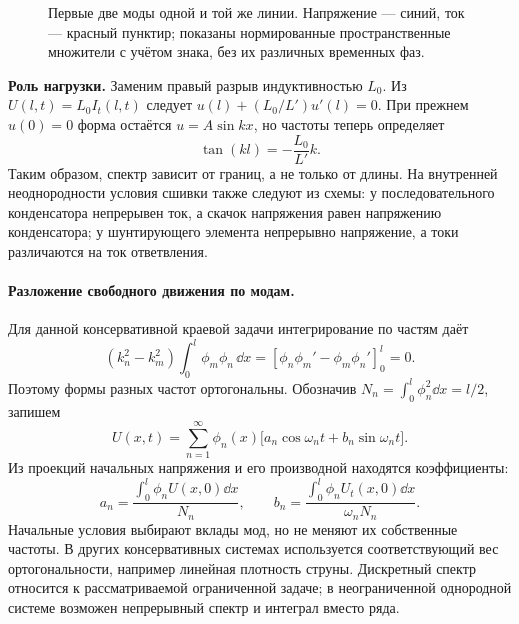 \begin{figure}[H]\centering

\caption{Первые две моды одной и той же линии. Напряжение --- синий, ток --- красный пунктир; показаны нормированные пространственные множители с учётом знака, без их различных временных фаз.}
\end{figure}

\textbf{Роль нагрузки.} Заменим правый разрыв индуктивностью $L_0$. Из $U(l,t)=L_0I_t(l,t)$ следует $u(l)+(L_0/L')u'(l)=0$. При прежнем $u(0)=0$ форма остаётся $u=A\sin kx$, но частоты теперь определяет
\[
 \tan(kl)=-\frac{L_0}{L'}k.
\]
Таким образом, спектр зависит от границ, а не только от длины. На внутренней неоднородности условия сшивки также следуют из схемы: у последовательного конденсатора непрерывен ток, а скачок напряжения равен напряжению конденсатора; у шунтирующего элемента непрерывно напряжение, а токи различаются на ток ответвления.

\paragraph{Разложение свободного движения по модам.}
Для данной консервативной краевой задачи интегрирование по частям даёт
\[
 (k_n^2-k_m^2)\int_0^l\phi_m\phi_n\,\dd x
 =[\phi_n\phi_m'-\phi_m\phi_n']_0^l=0.
\]
Поэтому формы разных частот ортогональны. Обозначив $N_n=\int_0^l\phi_n^2\dd x=l/2$, запишем
\begin{equation}
 U(x,t)=\sum_{n=1}^{\infty}\phi_n(x)
 \bigl[a_n\cos\omega_nt+b_n\sin\omega_nt\bigr].
\end{equation}
Из проекций начальных напряжения и его производной находятся коэффициенты:
\[
 a_n=\frac{\int_0^l\phi_nU(x,0)\dd x}{N_n},\qquad
 b_n=\frac{\int_0^l\phi_nU_t(x,0)\dd x}{\omega_nN_n}.
\]
Начальные условия выбирают вклады мод, но не меняют их собственные частоты. В других консервативных системах используется соответствующий вес ортогональности, например линейная плотность струны. Дискретный спектр относится к рассматриваемой ограниченной задаче; в неограниченной однородной системе возможен непрерывный спектр и интеграл вместо ряда.
